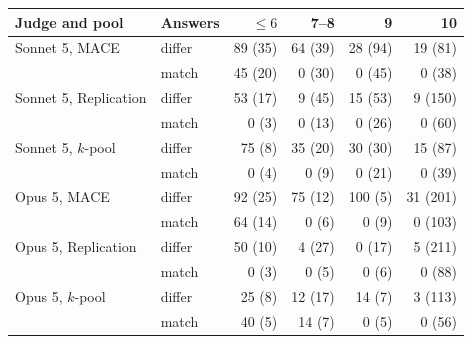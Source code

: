 \begin{tabular}{llrrrr}
\toprule
Judge and pool & Answers & $\leq 6$ & 7--8 & 9 & 10 \\
\midrule
Sonnet 5, \textsc{MACE} & differ & 89 (35) & 64 (39) & 28 (94) & 19 (81) \\
 & match & 45 (20) & 0 (30) & 0 (45) & 0 (38) \\
Sonnet 5, Replication & differ & 53 (17) & 9 (45) & 15 (53) & 9 (150) \\
 & match & 0 (3) & 0 (13) & 0 (26) & 0 (60) \\
Sonnet 5, $k$-pool & differ & 75 (8) & 35 (20) & 30 (30) & 15 (87) \\
 & match & 0 (4) & 0 (9) & 0 (21) & 0 (39) \\
Opus 5, \textsc{MACE} & differ & 92 (25) & 75 (12) & 100 (5) & 31 (201) \\
 & match & 64 (14) & 0 (6) & 0 (9) & 0 (103) \\
Opus 5, Replication & differ & 50 (10) & 4 (27) & 0 (17) & 5 (211) \\
 & match & 0 (3) & 0 (5) & 0 (6) & 0 (88) \\
Opus 5, $k$-pool & differ & 25 (8) & 12 (17) & 14 (7) & 3 (113) \\
 & match & 40 (5) & 14 (7) & 0 (5) & 0 (56) \\
\bottomrule
\end{tabular}
